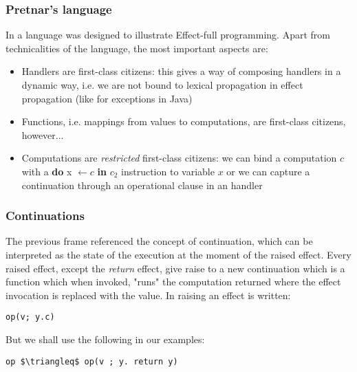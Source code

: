 \documentclass[t]{beamer}
\begin{document}
\begin{frame}
	\frametitle{Pretnar's language}
	
	In \cite{pratner} a language was designed to illustrate Effect-full programming. Apart from technicalities of the language, the most important aspects are:
	\begin{itemize}
		\item Handlers are first-class citizens: this gives a way of \alert{composing handlers} in a dynamic way, i.e. we are not bound to lexical propagation in effect propagation (like for exceptions in Java)
		\item Functions, i.e. mappings from values \alert{to computations}, are first-class citizens, however...
		\item Computations are \textit{restricted} first-class citizens: we can bind a computation $c$ with a \textbf{do} x $\leftarrow c$ \textbf{in} $c_2$  instruction to variable $x$ or we can capture a continuation through an \alert{operational clause} in an handler
		
	\end{itemize}
	
	
\end{frame}

\begin{frame}[fragile]
	\frametitle{Continuations}
	The previous frame referenced the concept of continuation, which can be interpreted as \alert{the state of the execution} at the moment of the raised effect.
	\newline
	Every raised effect, except the \textit{return} effect, give raise to a new continuation which is a function which when invoked, "runs" the computation returned where the effect invocation is replaced with the value.
	\newline
	In \cite{pratner} raising an effect is written: 
	\begin{lstlisting}[basicstyle=\small]
		op(v; y.c)
	\end{lstlisting}		
	But we shall use the following in our examples:
	\begin{lstlisting}[basicstyle=\small, mathescape= true]
		op $\triangleq$ op(v ; y. return y)
	\end{lstlisting}
\end{frame}
\end{document}
